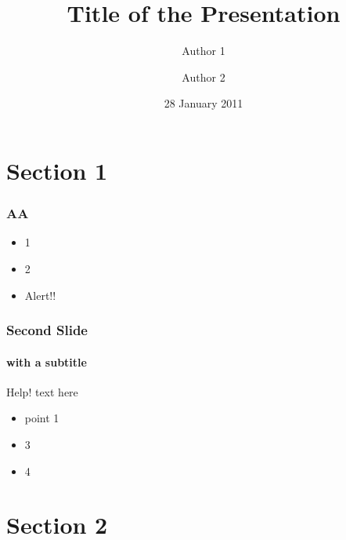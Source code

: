 \documentclass{beamer}
\title[Short Title]{Title of the Presentation}
\author[Auth. 1 \and Auth.2]{Author 1 \and Author 2}
\institute[UCL]{%
  Department of Statistical Science \\ %
  University College London
}
\date{28 January 2011}
\begin{document}
\begin{frame}
  \frametitle{}
  \titlepage
\end{frame}

\section{Section 1}

\begin{frame}
  \frametitle{AA}
  \begin{itemize}
  \item 1
  \item 2
    \pause
  \item \alert{Alert!!}
  \end{itemize}
\end{frame}

\begin{frame}
  \frametitle{Second Slide}
  \framesubtitle{with a subtitle}
  \begin{alertblock}{Help!}
    text here
    \begin{itemize}
    \item point 1
    \end{itemize}
  \end{alertblock}
  
  \begin{example}
    \begin{itemize}
    \item 3
    \item 4
    \end{itemize}
  \end{example}
\end{frame}

\section{Section 2}

\end{document}
